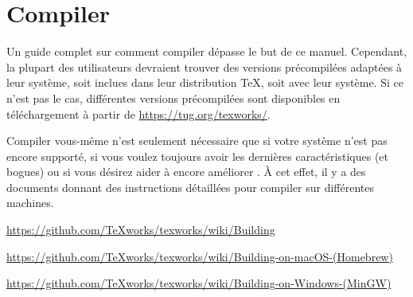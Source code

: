 
\chapter{Compiler {\Tw}}
\label{sec.compiling}

Un guide complet sur comment compiler \Tw{} dépasse le but de ce manuel. Cependant, la plupart des utilisateurs devraient trouver des versions précompilées adaptées à leur système, soit inclues dans leur distribution \TeX, soit avec leur système. Si ce n'est pas le cas, différentes versions précompilées sont disponibles en téléchargement à partir de \url{https://tug.org/texworks/}.

Compiler \Tw{} vous-même n'est seulement nécessaire que si votre système n'est pas encore supporté, si vous voulez toujours avoir les dernières caractéristiques (et bogues) ou si vous  désirez aider à encore améliorer \Tw. À cet effet, il y a des documents donnant des instructions détaillées pour compiler \Tw{} sur différentes machines.

\begin{OSLinux}
\noindent\url{https://github.com/TeXworks/texworks/wiki/Building} \\
\end{OSLinux}

\begin{OSMac}
\noindent\raggedright\url{https://github.com/TeXworks/texworks/wiki/Building-on-macOS-(Homebrew)} \\
\end{OSMac}

\begin{OSWindows}
\noindent\raggedright\url{https://github.com/TeXworks/texworks/wiki/Building-on-Windows-(MinGW)} \\
\end{OSWindows}
